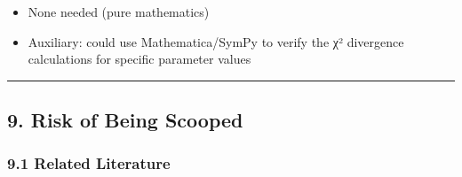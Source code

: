 \documentclass[
  12pt,
]{article}
\providecommand{\tightlist}{%
  \setlength{\itemsep}{0pt}\setlength{\parskip}{0pt}}
\begin{document}
\begin{itemize}
\tightlist
\item
  None needed (pure mathematics)
\item
  Auxiliary: could use Mathematica/SymPy to verify the χ² divergence
  calculations for specific parameter values
\end{itemize}

\begin{center}\rule{0.5\linewidth}{0.5pt}\end{center}

\subsection{9. Risk of Being Scooped}\label{risk-of-being-scooped}

\subsubsection{9.1 Related Literature}\label{related-literature}
\end{document}
